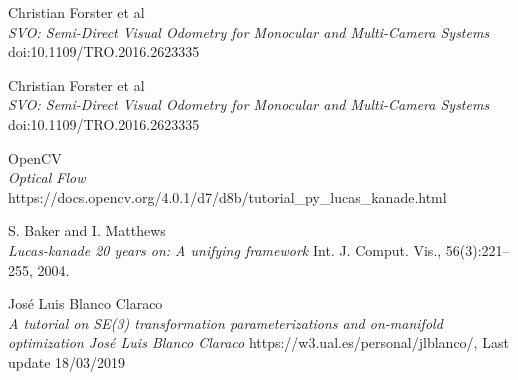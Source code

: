 \documentclass[11pt,a4paper,titlepage,oneside]{report}
\begin{document}
\begin{thebibliography}{1}

	Christian Forster et al\\
	\textit{SVO: Semi-Direct Visual Odometry for Monocular and Multi-Camera Systems}\\
	doi:10.1109/TRO.2016.2623335

	Christian Forster et al\\
	\textit{SVO: Semi-Direct Visual Odometry for Monocular and Multi-Camera Systems}\\
	doi:10.1109/TRO.2016.2623335

	OpenCV\\
	\textit{Optical Flow}\\
	https://docs.opencv.org/4.0.1/d7/d8b/tutorial\_py\_lucas\_kanade.html


	S. Baker and I. Matthews\\
	\textit{Lucas-kanade 20 years on: A unifying framework}
	Int. J. Comput. Vis., 56(3):221–255, 2004.


	José Luis Blanco Claraco\\
	\textit{A tutorial on SE(3) transformation parameterizations and on-manifold optimization José Luis Blanco Claraco}
	https://w3.ual.es/personal/jlblanco/, Last update 18/03/2019



\end{thebibliography}
\end{document}
